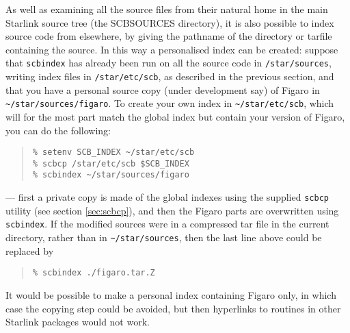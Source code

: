 \documentclass[twoside,11pt]{article}
\renewcommand{\_}{\texttt{\symbol{95}}}
\begin{document}
As well as examining all the source files from their natural home
in the main Starlink source tree (the SCB\_SOURCES directory),
it is also possible to index source code from elsewhere,
by giving the pathname of the directory
or tarfile containing the source.
In this way a personalised index can be created:
suppose that {\tt scbindex} has already been run
on all the source code in {\tt /star/sources},
writing index files in {\tt /star/etc/scb}, as described in
the previous section,
and that you have a personal source copy (under development say) of
Figaro in \verb|~/star/sources/figaro|.
To create your own index in \verb|~/star/etc/scb|,
which will for the most part match the global index
but contain your version of Figaro,
you can do the following:
\begin{quote}
\begin{verbatim}
% setenv SCB_INDEX ~/star/etc/scb
% scbcp /star/etc/scb $SCB_INDEX
% scbindex ~/star/sources/figaro
\end{verbatim}
\end{quote}
--- first a private copy is made of the global indexes using
the supplied {\tt scbcp} utility (see section \ref{sec:scbcp}),
and then the Figaro parts are overwritten using {\tt scbindex}.
If the modified sources were
in a compressed tar file in the current directory,
rather than in \verb|~/star/sources|,
then the last line above could be replaced by
\begin{quote}
\begin{verbatim}
% scbindex ./figaro.tar.Z
\end{verbatim}
\end{quote}
It would be possible to make a personal index containing Figaro only,
in which case the copying step could be avoided,
but then hyperlinks to routines in other Starlink packages
would not work.
\end{document}

